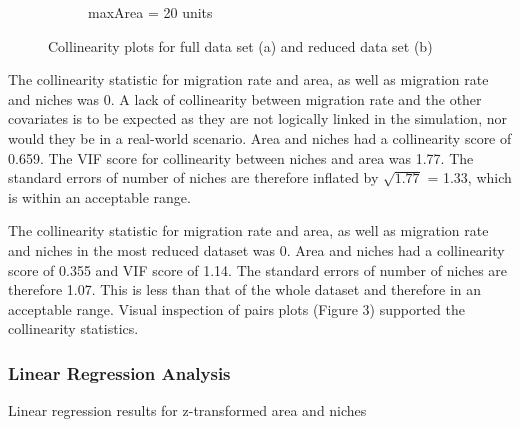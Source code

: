 \documentclass{article}
\begin{document}
\begin{figure}[!h]
\begin{subfigure}[b]{0.4\linewidth}
    \caption{maxArea = 20 units}
  \end{subfigure}
  \caption{Collinearity plots for full data set (a) and reduced data set (b)}
  \label{fig:Collinearity}
\end{figure}\bigskip

\noindent The collinearity statistic for migration rate and area, as well as migration rate and niches was 0. A lack of collinearity between migration rate and the other covariates is to be expected as they are not logically linked in the simulation, nor would they be in a real-world scenario. Area and niches had a collinearity score of 0.659. The VIF score for collinearity between niches and area was 1.77. The standard errors of number of niches are therefore inflated by $\sqrt{1.77}$ = 1.33, which is within an acceptable range. \bigskip

\noindent The collinearity statistic for migration rate and area, as well as migration rate and niches in the most reduced dataset was 0. Area and niches had a collinearity score of 0.355 and VIF score of 1.14. The standard errors of number of niches are therefore 1.07. This is less than that of the whole dataset and therefore in an acceptable range. Visual inspection of pairs plots (Figure 3) supported the collinearity statistics. 

\subsubsection{Linear Regression Analysis}

\begin{table}[h!]
\centering
\caption{Linear regression results for z-transformed area and niches}
   \end{table}\bigskip
\end{document}
